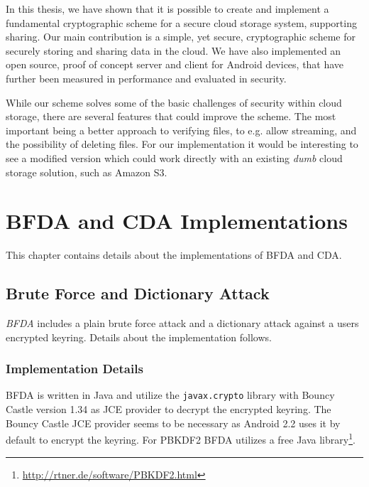 \documentclass[pdftex,english,10pt,b5paper,twoside]{book}
\begin{document}
In this thesis, we have shown that it is possible to create and implement a
fundamental cryptographic scheme for a secure cloud storage system, supporting
sharing. Our main contribution is a simple, yet secure, cryptographic scheme
for securely storing and sharing data in the cloud. We have also implemented an
open source, proof of concept server and client for Android devices, that have
further been measured in performance and evaluated in security.

While our scheme solves some of the basic challenges of security within cloud
storage, there are several features that could improve the scheme. The most
important being a better approach to verifying files, to e.g. allow streaming,
and the possibility of deleting files. For our implementation it would be
interesting to see a modified version which could work directly with
an existing \emph{dumb} cloud storage solution, such as Amazon S3.



\appendix
\appendixpage
\addappheadtotoc
\chapter{\ac{BFDA} and \ac{CDA} Implementations}
\label{ap:other}

This chapter contains details about the implementations of \ac{BFDA} and
\ac{CDA}.

\section{Brute Force and Dictionary Attack}

\emph{\ac{BFDA}} includes a plain brute force attack and a dictionary attack against
a users encrypted keyring. Details about the implementation follows.

\subsection{Implementation Details}

\ac{BFDA} is written in Java and utilize the \texttt{javax.crypto} library with
Bouncy Castle version 1.34 as JCE provider to decrypt the encrypted keyring.
The Bouncy Castle JCE provider seems to be necessary as Android 2.2 uses it by
default to encrypt the keyring. For \ac{PBKDF2} \ac{BFDA} utilizes a free
Java library\footnote{\url{http://rtner.de/software/PBKDF2.html}}.
\end{document}
